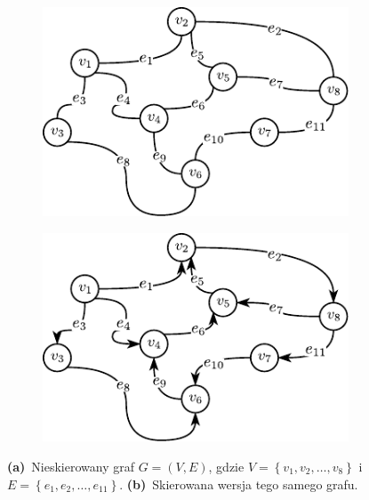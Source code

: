\begin{figure}[!htbp]
	\null\hfill
	\begin{subfigure}[b]{0.32\textwidth}
		\includegraphics[width=\textwidth]{Chapter_I/DAG-UDAG-example/a}
		\caption{}
		\label{fig:dagudacExample:a}
	\end{subfigure}
	\hfill
	\begin{subfigure}[b]{0.32\textwidth}
		\includegraphics[width=\textwidth]{Chapter_I/DAG-UDAG-example/b}
		\caption{}
		\label{fig:dagudacExample:b}
	\end{subfigure}
	\hfill\null
	\caption{
		\textbf{(a)}~Nieskierowany graf $G = \left( V, E \right)$, gdzie $V = \left\{ v_{1}, v_{2}, \dots, v_{8} \right\}$ i~$E = \left\{ e_{1}, e_{2}, \dots, e_{11} \right\}$.
		\textbf{(b)}~Skierowana wersja tego samego grafu.
	}
	\label{fig:dagudacExample}
\end{figure}




